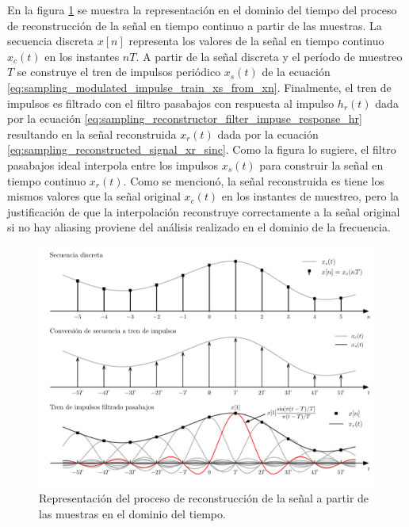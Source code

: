 \documentclass[a4paper]{report}
\begin{document}
En la figura \ref{fig:sampling_dc_conversion_math_representation} se muestra la representación en el dominio del tiempo del proceso de reconstrucción de la señal en tiempo continuo a partir de las muestras. La secuencia discreta \(x[n]\) representa los valores de la señal en tiempo continuo \(x_c(t)\) en los instantes \(nT\). A partir de la señal discreta y el período de muestreo \(T\) se construye el tren de impulsos periódico \(x_s(t)\) de la ecuación \ref{eq:sampling_modulated_impulse_train_xs_from_xn}. Finalmente, el tren de impulsos es filtrado con el filtro pasabajos con respuesta al impulso \(h_r(t)\) dada por la ecuación \ref{eq:sampling_reconstructor_filter_impuse_response_hr} resultando en la señal reconstruida \(x_r(t)\) dada por la ecuación \ref{eq:sampling_reconstructed_signal_xr_sinc}. Como la figura lo sugiere, el filtro pasabajos ideal interpola entre los impulsos \(x_s(t)\) para construir la señal en tiempo continuo \(x_r(t)\). Como se mencionó, la señal reconstruida es tiene los mismos valores que la señal original \(x_c(t)\) en los instantes de muestreo, pero la justificación de que la interpolación reconstruye correctamente a la señal original si no hay aliasing proviene del análisis realizado en el dominio de la frecuencia.
\begin{figure}[!htb]
 \begin{center}
 \includegraphics[width=1\textwidth]{figuras/sampling_dc_conversion_math_representation.pdf}
 \caption{\label{fig:sampling_dc_conversion_math_representation} Representación del proceso de reconstrucción de la señal a partir de las muestras en el dominio del tiempo.}
 \end{center}
\end{figure} 
\end{document}
